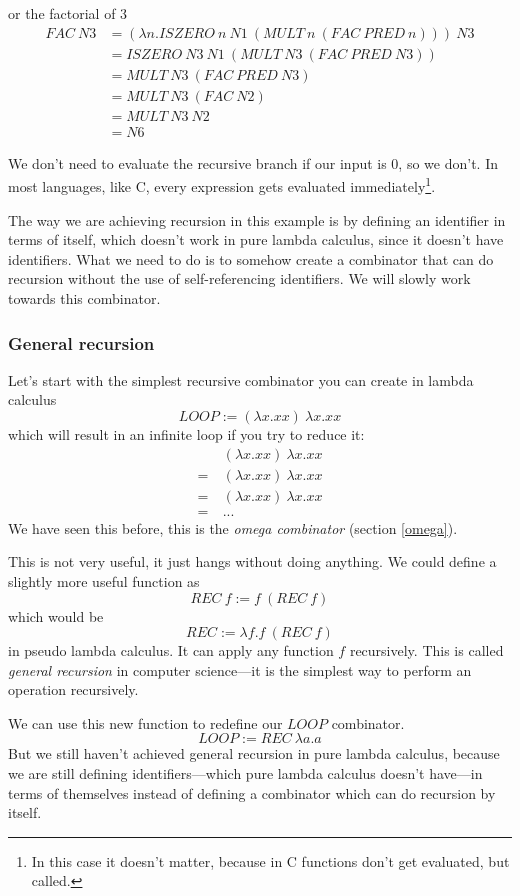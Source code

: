 \documentclass[11pt]{article}
\begin{document}
or the factorial of 3
\begin{align*}
	FAC\ N3&=(\lambda n.ISZERO\ n\ N1\ (MULT\ n\ (FAC\ PRED\ n)))\ N3\\
	&=ISZERO\ N3\ N1\ (MULT\ N3\ (FAC\ PRED\ N3))\\
	&=MULT\ N3\ (FAC\ PRED\ N3)\\
	&=MULT\ N3\ (FAC\ N2)\\
	&=MULT\ N3\ N2\\
	&=N6
\end{align*}

We don't need to evaluate the recursive branch if our input is 0, so we don't.
In most languages, like C, every expression gets evaluated
immediately\footnote{In this case it doesn't matter, because in C functions
don't get evaluated, but called.}.

The way we are achieving recursion in this example is by defining an identifier
in terms of itself, which doesn't work in pure lambda calculus, since it
doesn't have identifiers. What we need to do is to somehow create a combinator
that can do recursion without the use of self-referencing identifiers. We will
slowly work towards this combinator.

\subsubsection{General recursion}\label{general_recursion}

Let's start with the simplest recursive combinator you can create in lambda
calculus
\[LOOP:=(\lambda x.xx)\ \lambda x.xx\]
which will result in an infinite loop if you try to reduce it:
\begin{align*}
	&(\lambda x.xx)\ \lambda x.xx \\
	=\ &(\lambda x.xx)\ \lambda x.xx \\
	=\ &(\lambda x.xx)\ \lambda x.xx \\
	=\ & ...
\end{align*}
We have seen this before, this is the \emph{omega combinator} (section
\ref{omega}).

This is not very useful, it just hangs without doing anything. We could define
a slightly more useful function as
\[REC\ f:=f\ (REC\ f)\]
which would be
\[REC:=\lambda f.f\ (REC\ f)\]
in pseudo lambda calculus. It can apply any function \(f\) recursively. This is
called \emph{general recursion} in computer science---it is the simplest way to
perform an operation recursively.

We can use this new function to redefine our \(LOOP\) combinator.
\[LOOP:=REC\ \lambda a.a\]
But we still haven't achieved general recursion in pure lambda calculus,
because we are still defining identifiers---which pure lambda calculus doesn't
have---in terms of themselves instead of defining a combinator which can do
recursion by itself.
\end{document}
